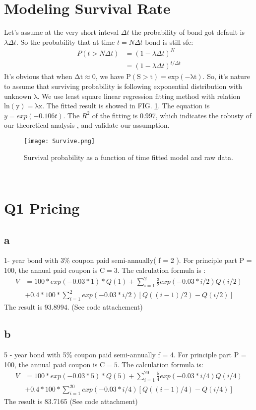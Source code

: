 \documentclass[a4paper,11pt]{article} %
\begin{document}
		\section{Modeling Survival Rate}
		Let's assume at the very short inteval $\Delta t $ the probability of bond got default is $\lambda \Delta t$. So the probability that at time $t = N \Delta t $ bond is still sfe:
		\begin{align*}
			P( t > N \Delta t) &= (1 - \lambda \Delta t) ^{N}\\
			& = (1 - \lambda \Delta t) ^{t/\Delta t}
		\end{align*}
	It's obvious that when $ \mathrm{ \Delta t \approx 0 }$, we have $\mathrm{ P( S > t) = exp(-\lambda t) }$. So, it's nature to assume that surviving probability is following exponential distribution with unknown $\mathrm{\lambda}$. We use least square linear regression fitting method with relation $\mathrm{ln(y) = \lambda x}$. The fitted result is showed in  FIG. \ref{FIG1}. The equation is $y = exp(-0.106t)$. The $R^{2}$ of the fitting is 0.997, which indicates the robusty of our theoretical analysis , and validate our assumption.
\begin{figure}[hbh]
	\centering
	\texttt{[image: Survive.png]}
	\caption{Survival probability as a function of time fitted model and raw data.}
	\label{FIG1}
\end{figure}\\
\section{Q1 Pricing}
\subsection{a}
1- year bond with 3\% coupon paid semi-annually( f = 2 ). For principle part P = 100, the annual paid coupon is $\mathrm{C = 3}$.  The calculation formula is :
\begin{align*}
	V &= 100 * exp(-0.03 * 1) * Q(1) + \sum_{i=1}^{2}\frac{3}{2}exp(-0.03 * i / 2) Q(i/2) \\
	&+ 0.4*100*\sum_{i=1}^{2}exp(-0.03*i/2)[Q((i-1)/2) - Q(i/2)]
\end{align*}
The result is 93.8994. (See code attachement)
\subsection{b}
5 - year bond with 5\% coupon paid semi-annually f = 4. For principle part P = 100, the annual paid coupon is $\mathrm{C = 5}$. The calculation formula is:
\begin{align*}
	V &= 100 * exp(-0.03 * 5) * Q(5) + \sum_{i=1}^{20}\frac{5}{4}exp(-0.03 * i / 4) Q(i/4) \\
	&+ 0.4*100*\sum_{i=1}^{20}exp(-0.03*i/4)[Q((i-1)/4) - Q(i/4)]
\end{align*}
The result is 83.7165 (See code attachment)
\end{document}
